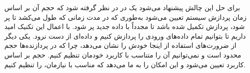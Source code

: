برای حل این چالش پیشنهاد می‌شود یک  در  در نظر گرفته شود که حجم آن بر اساس زمان پردازش سیستم تعیین می‌شود به‌طوری که در مدت زمانی که طول می‌کشد تا  پر شود، پردازش تکمیل شده باشد تا مجدداً  با داده جدید پر شود. با اعمال این تکنیک امید داریم تا بتوانیم تمام داده‌های ورودی را پردازش کنیم و داده‌ای از دست نرود. یکی دیگر از ضرورت‌های استفاده از  اینجا خودش را نشان می‌دهد، چرا که در پردازنده‌ها حجم  محدود است و نمی‌توانیم آن را متناسب با کاربرد خودمان تنظیم کنیم. حجم  بر اساس کاربرد تعیین می‌شود و این امکان را به ما می‌دهد که مناسب با نیازمان،  را تنظیم کنیم.

